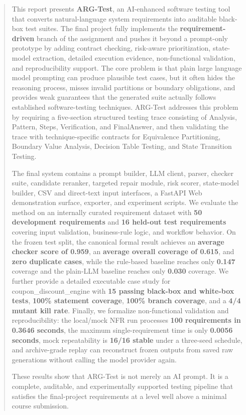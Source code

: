 \documentclass{article}
\renewcommand{\texttt}[1]{{\normalfont #1}}
\begin{document}
\begin{abstract}
This report presents \textbf{ARG-Test}, an AI-enhanced software testing tool that converts natural-language system requirements into auditable black-box test suites. The final project fully implements the \textbf{requirement-driven} branch of the assignment and pushes it beyond a prompt-only prototype by adding contract checking, risk-aware prioritization, state-model extraction, detailed execution evidence, non-functional validation, and reproducibility support. The core problem is that plain large language model prompting can produce plausible test cases, but it often hides the reasoning process, misses invalid partitions or boundary obligations, and provides weak guarantees that the generated suite actually follows established software-testing techniques. ARG-Test addresses this problem by requiring a five-section structured testing trace consisting of \texttt{Analysis}, \texttt{Pattern}, \texttt{Steps}, \texttt{Verification}, and \texttt{FinalAnswer}, and then validating the trace with technique-specific contracts for Equivalence Partitioning, Boundary Value Analysis, Decision Table Testing, and State Transition Testing.

The final system contains a prompt builder, LLM client, parser, checker suite, candidate reranker, targeted repair module, risk scorer, state-model builder, CSV and direct-text input interfaces, a FastAPI Web demonstration surface, exporter, and experiment scripts. We evaluate the method on an internally curated requirement dataset with \textbf{50 development requirements} and \textbf{16 held-out test requirements} covering input validation, business-rule logic, and workflow behavior. On the frozen test split, the canonical formal result achieves an \textbf{average checker score of 0.959}, an \textbf{average overall coverage of 0.615}, and \textbf{zero duplicate cases}, while the rule-based baseline reaches only \textbf{0.147} coverage and the plain-LLM baseline reaches only \textbf{0.030} coverage. We further provide a detailed executable case study for \texttt{coupon\_discount\_engine} with \textbf{15 passing black-box and white-box tests}, \textbf{100\% statement coverage}, \textbf{100\% branch coverage}, and a \textbf{4/4 mutant kill rate}. Finally, we formalize non-functional validation and reproducibility: the local/mock NFR run processes \textbf{100 requirements in 0.3646 seconds}, the maximum single-requirement time is only \textbf{0.0056 seconds}, mock repeatability is \textbf{16/16 stable} under a three-seed schedule, and archive-grade replay can reconstruct frozen outputs from saved raw generations without calling the model provider again.

These results show that ARG-Test is not merely an AI prompt. It is a complete, auditable, and experimentally supported testing pipeline that satisfies the final-project requirements at a level well above a minimal course submission.
\end{abstract}
\end{document}
